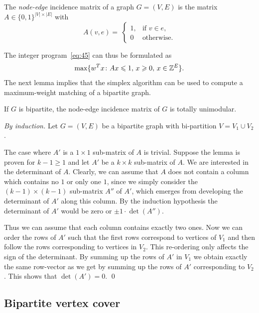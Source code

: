The \emph{node-edge} incidence matrix of a graph $G = (V,E)$ is the 
matrix $A \in \{0,1\}^{|V|\times|E|}$ with 
\begin{displaymath}
  A(v,e) = \
  \begin{cases}
    1, & \text{if } v \in e, \\
    0 & \text{otherwise.}
  \end{cases}
\end{displaymath}


The integer program~\eqref{eq:45} can thus be formulated as 
\begin{equation}
  \label{eq:46}
  \max\{w^Tx \colon Ax\leqslant1, \, x\geqslant0, \, x \in \mathbb{Z}^E\}. 
\end{equation}
The next lemma implies that the simplex algorithm can be used to
compute a maximum-weight matching of a bipartite graph. 

\begin{lemma}
  \label{po:lem:9}
  If $G$ is bipartite, the node-edge incidence matrix of $G$ is
  totally unimodular. 
\end{lemma}


\begin{proof}[By induction]
  Let  $G = (V,E)$ be a bipartite graph with bi-partition 
  $V=V_1\cup V_2$. 
  
  The case where $A'$ is a $1 \times 1$ sub-matrix of $A$ is 
  trivial.
  Suppose the lemma is proven for $k-1 \geq 1$ and 
  let $A'$ be a $k\times k$ sub-matrix of $A$. We are interested 
  in the determinant of $A$. Clearly, we can assume that $A$ 
  does not contain a column which contains no $1$ or only one 
  $1$, since we simply consider the $(k-1) \times (k-1)$ 
  sub-matrix $A''$ of $A'$, which emerges from developing the 
  determinant of $A'$ along this column. By the induction 
  hypothesis the determinant of $A'$ would be zero or 
  $\pm1\cdot \det(A'')$.
  
  Thus we can assume that each column contains exactly two ones. Now
  we can order the rows of $A'$ such that the first rows correspond to
  vertices of $V_1$ and then follow the rows corresponding to vertices
  in $V_2$. This re-ordering only affects the sign of the
  determinant. By summing up the rows of $A'$ in $V_1$ we obtain
  exactly the same row-vector as we get by summing up the rows of $A'$
  corresponding to $V_2$. This shows that $\det(A')=0$.  \qed 
\end{proof}


\subsection{Bipartite vertex cover} 


